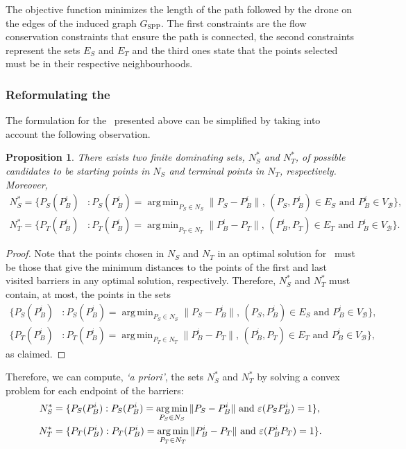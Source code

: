 \documentclass[a4paper,  review, authoryear, 1p.]{elsarticle}
\DeclareMathOperator*{\argmin}{arg\,min}
\newcommand{\SPPN}{{\sf{H-SPPN}\xspace }}
\newcommand{\VB}{{V^{}_{\mathcal B}}}
\newcommand{\ES}{{E^{}_{S}}}
\newcommand{\ET}{{E^{}_{T}}}
\newcommand{\GSPP}{{G_{\text{SPP}}}}
\newtheorem{prop}{Proposition}
\begin{document}
		The objective function minimizes the length of the path followed by the drone on the edges of the induced graph $\GSPP$. The first constraints are the flow conservation constraints that ensure the path is connected, the second constraints represent the sets $\ES$ and $\ET$ and the third ones state that the points selected must be in their respective neighbourhoods.
		
		
		
		\subsubsection{Reformulating the \SPPN}\label{section:reformulation}
		The formulation for the \SPPN \ presented above can be simplified by taking into account the following observation.
		\begin{prop}
			There exists two finite dominating sets, $N_S^*$ and $N_T^*$, of possible candidates to be starting points in  $N_S$ and terminal points in $N_T$, respectively. Moreover,
			\begin{align*}
				N^*_S=\{P_S(P_B^i)&:P_S(P_B^i)=\argmin_{P_S\in N_S} \|P_S - P_B^i\|,\,(P_S, P_B^i)\in E_S\text{ and }P_B^i\in\VB\},\\
				N^*_T=\{P_T(P_B^i)&:P_T(P_B^i)=\argmin_{P_T\in N_T} \|P_B^i - P_T\|,\,(P_B^i, P_T)\in E_T\text{ and }P_B^i\in\VB\}.
			\end{align*} 
		\end{prop}
		\begin{proof}
			Note that the points chosen in $N_S$ and $N_T$ in an optimal solution for \SPPN \ must be those that give the minimum distances to the points of the first and last visited barriers in any optimal solution, respectively. Therefore, $N_S^*$ and $N_T^*$ must contain, at most, the points in the sets
			\begin{align*}
				\{P_S(P_B^i)&:P_S(P_B^i)=\argmin_{P_S\in N_S} \|P_S - P_B^i\|,\,(P_S, P_B^i)\in E_S\text{ and }P_B^i\in\VB\},\\
				\{P_T(P_B^i)&:P_T(P_B^i)=\argmin_{P_T\in N_T} \|P_B^i - P_T\|,\,(P_B^i, P_T)\in E_T\text{ and }P_B^i\in\VB\},
			\end{align*} 
			as claimed.
		\end{proof}
		\noindent
		Therefore, we can compute, \textit{`a priori'},  the sets $N_S^*$ and $N_T^*$ by solving a convex problem for each endpoint of the barriers:
		\begin{align*}
			N_S^*&=\{P_S(P_B^i):P_S(P_B^i)=\argmin_{P_S\in N_S} \|P_S - P_B^i\|\text{ and }\varepsilonvar{P_S}{P_B^i}=1\},\\
			N_T^*&=\{P_T(P_B^i):P_T(P_B^i)=\argmin_{P_T\in N_T} \|P_B^i - P_T\|\text{ and }\varepsilonvar{P_B^i}{P_T}=1\}.
		\end{align*}
		
\end{document}
